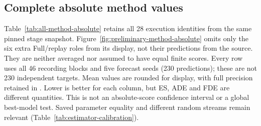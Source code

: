 \subsection{Complete absolute method values}
\label{sec:all-method-absolute}
Table~\ref{tab:all-method-absolute} retains all 28 execution identities from
the same pinned stage snapshot. Figure~\ref{fig:preliminary-method-absolute}
omits only the six extra Full/replay roles from its display, not their
predictions from the source. They are neither averaged nor assumed to
have equal finite scores. Every row uses all 46 recording blocks and five
forecast seeds (230 predictions); these are not 230 independent targets.
Mean values are rounded for display, with full precision retained in
.
Lower is better for each column, but ES, ADE and FDE are different
quantities. This is not an absolute-score confidence interval or a global
best-model test. Saved parameter equality and different random streams
remain relevant (Table~\ref{tab:estimator-calibration}).
\begingroup\small
